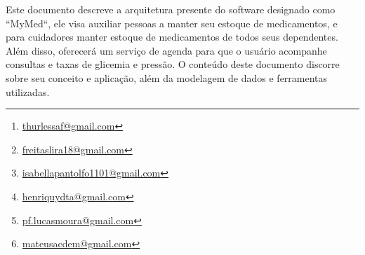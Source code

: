 \documentclass[
	article,			%
	12pt,				%
	oneside,			%
	a4paper,			%
    BIBLATEX,           %
	english,			%
	brazil,				%
	sumario=tradicional
	]{abntex2}
\title{\nomeprojeto}
\author{
Arthur Augusto Lessa Ferreira\inst{1}\thanks{\url{thurlessaf@gmail.com}}, 
Fernando Freitas de Lira\inst{1}\thanks{\url{freitaslira18@gmail.com}},
\\ Isabella Pantolfo Melo\inst{1}\thanks{\url{isabellapantolfo1101@gmail.com}}, 
Henriquy Dias Terto Alves\inst{1}\thanks{\url{henriquydta@gmail.com}},
\\ Lucas da Conceição Silva Moura\inst{1}\thanks{\url{pf.lucasmoura@gmail.com}},
\\ Mateus Armando Carrara de Mendonça\inst{1}\thanks{\url{mateusacdem@gmail.com} }}
\newcommand\nomeprojeto{MyMed}
\begin{document}


\frenchspacing 


%
%

\maketitle


\begin{abstract}
    This document describes the current architecture of the software designated as ``\nomeprojeto``, which aims to help people maintain their medication supply; and for caregivers maintain medication supplies for all their dependents. In addition, it will offer a scheduling service so that the user can track appointments and blood glucose and blood pressure levels. The content of this document discusses its concept and application, in addition to the data modeling and tools used.
\end{abstract}
     
\begin{resumo1} 
  Este documento descreve a arquitetura presente do software designado como ``\nomeprojeto``, ele visa auxiliar pessoas a manter seu estoque de medicamentos, e para cuidadores manter estoque de medicamentos de todos seus dependentes. Além disso, oferecerá um serviço de agenda para que o usuário acompanhe consultas e taxas de glicemia e pressão. O conteúdo deste documento discorre sobre seu conceito e aplicação, além da modelagem de dados e ferramentas utilizadas.
\end{resumo1}




\end{document}
